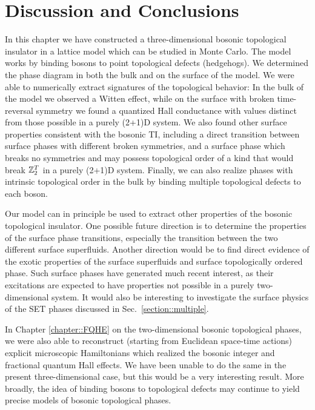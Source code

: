 \section{Discussion and Conclusions}
\label{sec::discussion}
In this chapter we have constructed a three-dimensional bosonic topological insulator in a lattice model which can be studied in Monte Carlo. The model works by binding bosons to point topological defects (hedgehogs). We determined the phase diagram in both the bulk and on the surface of the model. We were able to numerically extract signatures of the topological behavior: In the bulk of the model we observed a Witten effect, while on the surface with broken time-reversal symmetry we found a quantized Hall conductance with values distinct from those possible in a purely (2+1)D system. We also found other surface properties consistent with the bosonic TI, including a direct transition between surface phases with different broken symmetries, and a surface phase which breaks no symmetries and may possess topological order of a kind that would break $\mathbb{Z}_2^T$ in a purely (2+1)D system. Finally, we can also realize phases with intrinsic topological order in the bulk by binding multiple topological defects to each boson.

Our model can in principle be used to extract other properties of the bosonic topological insulator. One possible future direction is to determine the properties of the surface phase transitions, especially the transition between the two different surface superfluids. Another direction would be to find direct evidence of the exotic properties of the surface superfluids and surface topologically ordered phase. Such surface phases have generated much recent interest, as their excitations are expected to have properties not possible in a purely two-dimensional system.\cite{SenthilVishwanath,Chen2014,Cho2014} It would also be interesting to investigate the surface physics of the SET phases discussed in Sec.~\ref{section::multiple}.

In Chapter \ref{chapter::FQHE} on the two-dimensional bosonic topological phases, we were also able to reconstruct (starting from Euclidean space-time actions) explicit microscopic Hamiltonians which realized the bosonic integer and fractional quantum Hall effects. We have been unable to do the same in the present three-dimensional case, but this would be a very interesting result. More broadly, the idea of binding bosons to topological defects may continue to yield precise models of bosonic topological phases.

